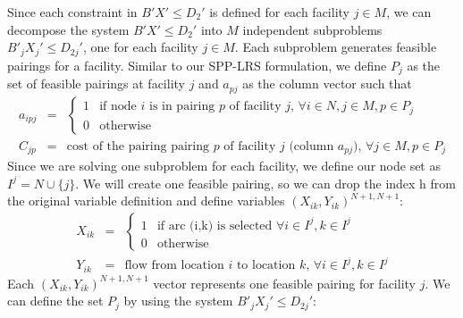 Since each constraint in $B'X'  \leq  D_2'$ is defined for each facility $j \in M$, we can decompose 
the system $B'X'  \leq  D_2'$ into $M$ independent subproblems 
$B'_jX_j' \leq D_{2j}'$,  one for each facility $j \in M$. Each subproblem 
generates feasible pairings for a facility. Similar to our SPP-LRS formulation, we define  
$P_j$ as the set of feasible pairings at facility $j$ and $a_{pj}$ as the column 
vector such that  
\begin{eqnarray*}
a_{ipj} & = & \left \{  \begin{array}{ll}
                 1 & \mbox{if node $i$ is in pairing $p$ of facility $j$, $\forall i \in N, j \in M, p \in P_{j}$ } \\
                 0 & \mbox{otherwise}
                         \end{array}
              \right. \\
C_{jp} &=&\mbox{cost of the pairing pairing $p$  of facility $j$ (column $a_{pj}$), $\forall j \in M, p \in P_{j}$} 
\end{eqnarray*} 
Since we are solving one subproblem for each facility, we define our node set 
as $I^j=N \cup \{j\}$. We will create one feasible pairing, so we can drop the 
index h from the original variable definition and define variables 
$(X_{ik},Y_{ik})^{N+1,N+1}$:
\begin{eqnarray*}
X_{ik} & = & \left\{ \begin{array}{ll}
                 1  & \mbox{if arc (i,k) is selected $\forall i \in I^j, k \in I^j$}\\
                 0  & \mbox{otherwise}                                                  
                \end{array} 
              \right. \\
Y_{ik} & = & \mbox{flow from location $i$ to location $k$, $\forall i \in I^j, k \in I^j$}
\end{eqnarray*}
Each $(X_{ik},Y_{ik})^{N+1,N+1}$ vector represents one feasible pairing for facility $j$.
We can define the set $P_j$ by using the system $B'_jX_j' \leq D_{2j}'$:


